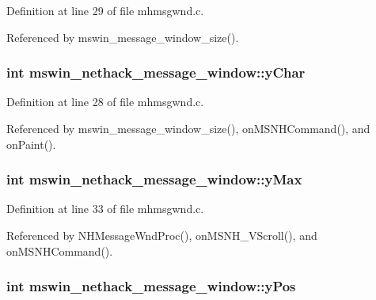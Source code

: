Definition at line 29 of file mhmsgwnd.\+c.



Referenced by mswin\+\_\+message\+\_\+window\+\_\+size().

\hypertarget{structmswin__nethack__message__window_abcddabdea03ae3f33b1459fb81075dae}{
\subsubsection[{y\+Char}]{\setlength{\rightskip}{0pt plus 5cm}int mswin\+\_\+nethack\+\_\+message\+\_\+window\+::y\+Char}}\label{structmswin__nethack__message__window_abcddabdea03ae3f33b1459fb81075dae}


Definition at line 28 of file mhmsgwnd.\+c.



Referenced by mswin\+\_\+message\+\_\+window\+\_\+size(), on\+M\+S\+N\+H\+Command(), and on\+Paint().

\hypertarget{structmswin__nethack__message__window_a89b10107b69dc753430b418076cb300f}{
\subsubsection[{y\+Max}]{\setlength{\rightskip}{0pt plus 5cm}int mswin\+\_\+nethack\+\_\+message\+\_\+window\+::y\+Max}}\label{structmswin__nethack__message__window_a89b10107b69dc753430b418076cb300f}


Definition at line 33 of file mhmsgwnd.\+c.



Referenced by N\+H\+Message\+Wnd\+Proc(), on\+M\+S\+N\+H\+\_\+\+V\+Scroll(), and on\+M\+S\+N\+H\+Command().

\hypertarget{structmswin__nethack__message__window_aa0b66211653f6020214bb6e9ba806e39}{
\subsubsection[{y\+Pos}]{\setlength{\rightskip}{0pt plus 5cm}int mswin\+\_\+nethack\+\_\+message\+\_\+window\+::y\+Pos}}\label{structmswin__nethack__message__window_aa0b66211653f6020214bb6e9ba806e39}


